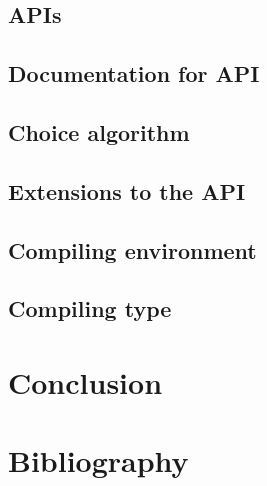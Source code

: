 \documentclass[10pt,letterpaper,onecolumn,draftclsnofoot]{IEEEtran}
\begin{document}
\subsection{APIs}

\subsection{Documentation for API}

\subsection{Choice algorithm}

\subsection{Extensions to the API}

\subsection{Compiling environment}

\subsection{Compiling type}

\section{Conclusion}

\newpage

\section{Bibliography}
\end{document}
